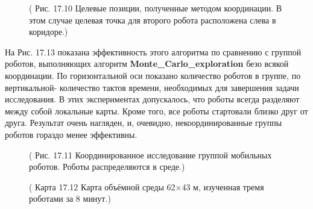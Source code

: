 \documentclass[10pt,a4paper]{article}
\begin{document}
\begin{figure}[H]
	\caption{ ( Рис. 17.10 Целевые позиции, полученные методом координации. В этом случае целевая точка для второго робота расположена слева в коридоре.) }
	\label{fig:1710orig}
\end{figure}

На Рис. 17.13 показана эффективность этого алгоритма по сравнению с группой роботов, выполняющих алгоритм \textbf{Monte\_Carlo\_exploration} безо всякой координации. По горизонтальной оси показано количество роботов в группе, по вертикальной- количество тактов времени, необходимых для завершения задачи исследования. В этих экспериментах допускалось, что роботы всегда разделяют между собой локальные карты. Кроме того, все роботы  стартовали близко друг от друга. Результат очень нагляден, и, очевидно, некоординированные группы роботов гораздо менее эффективны.

\begin{figure}[H]
	\caption{ ( Рис. 17.11 Координированное исследование группой мобильных роботов. Роботы распределяются в среде.) }
	\label{fig:1711orig}
\end{figure}

\begin{figure}[H]
	\caption{ ( Карта 17.12 Карта объёмной среды 62$\times$43 м, изученная тремя роботами за 8 минут.) }
	\label{fig:1712orig}
\end{figure}
\end{document}
